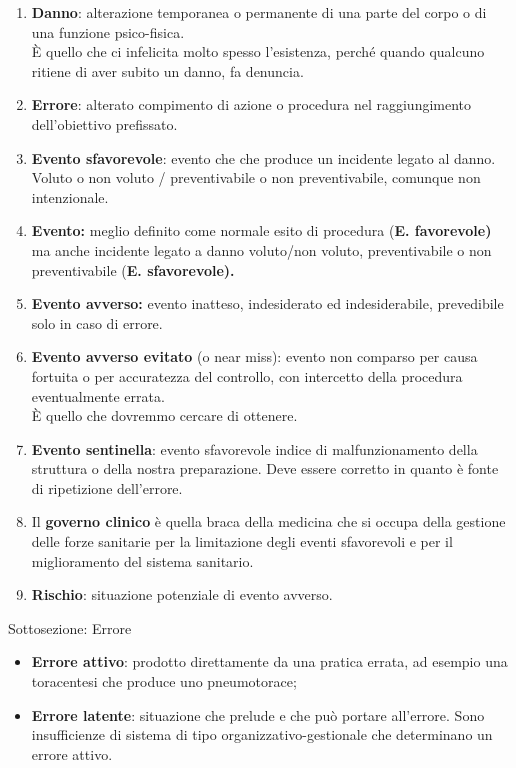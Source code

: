 \documentclass[]{article}
\begin{document}
\begin{enumerate}
\def\labelenumi{\arabic{enumi}.}
\item
  \textbf{Danno}: alterazione temporanea o permanente di una parte del
  corpo o di una funzione psico-fisica.\\
  È quello che ci infelicita molto spesso l'esistenza, perché quando
  qualcuno ritiene di aver subito un danno, fa denuncia.
\item
  \textbf{Errore}: alterato compimento di azione o procedura nel
  raggiungimento dell'obiettivo prefissato.
\item
  \textbf{Evento sfavorevole}: evento che che produce un incidente
  legato al danno. Voluto o non voluto / preventivabile o non
  preventivabile, comunque non intenzionale.
\item
  \textbf{Evento:} meglio definito come normale esito di procedura
  (\textbf{E. favorevole)} ma anche incidente legato a danno voluto/non
  voluto, preventivabile o non preventivabile (\textbf{E. sfavorevole).}
\item
  \textbf{Evento avverso:} evento inatteso, indesiderato ed
  indesiderabile, prevedibile solo in caso di errore.
\item
  \textbf{Evento avverso evitato} (o near miss): evento non comparso per
  causa fortuita o per accuratezza del controllo, con intercetto della
  procedura eventualmente errata.\\
  È quello che dovremmo cercare di ottenere.
\item
  \textbf{Evento sentinella}: evento sfavorevole indice di
  malfunzionamento della struttura o della nostra preparazione. Deve
  essere corretto in quanto è fonte di ripetizione dell'errore.
\item
  Il \textbf{governo clinico} è quella braca della medicina che si
  occupa della gestione delle forze sanitarie per la limitazione degli
  eventi sfavorevoli e per il miglioramento del sistema sanitario.
\item
  \textbf{Rischio}: situazione potenziale di evento avverso.
\end{enumerate}

Sottosezione: Errore

\begin{itemize}
\item
  \textbf{Errore attivo}: prodotto direttamente da una pratica errata,
  ad esempio una toracentesi che produce uno pneumotorace;
\item
  \textbf{Errore latente}: situazione che prelude e che può portare
  all'errore. Sono insufficienze di sistema di tipo
  organizzativo-gestionale che determinano un errore attivo.
\end{itemize}
\end{document}
